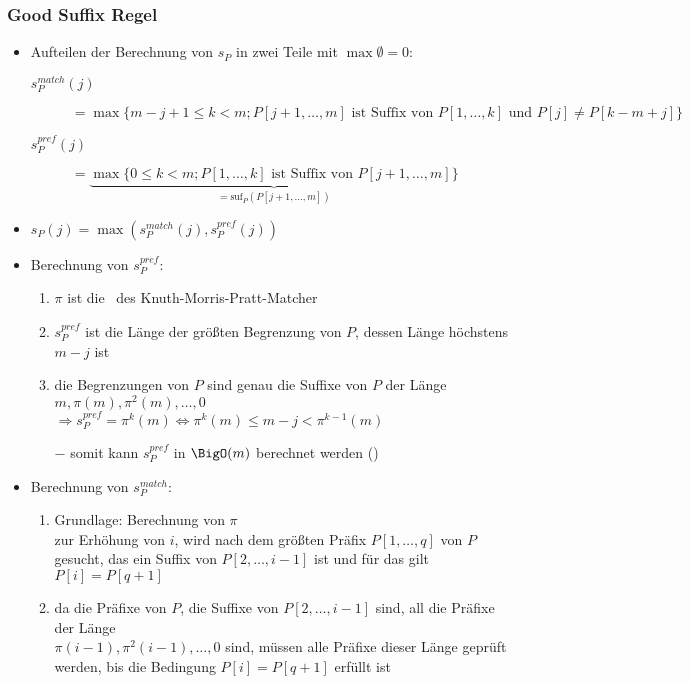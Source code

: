 \subsubsection*{Good Suffix Regel}
\begin{itemize}[itemsep=-2pt]
	\item Aufteilen der Berechnung von $s_P$ in zwei Teile mit $\max\emptyset=0$:
		\begin{description}
			\item[$s_P^{match}(j)$] $= \max\{m-j+1\leq k<m;P[j+1,\dots,m]\text{ ist Suffix von }P[1,\dots,k]\text{ und }P[j]\neq P[k-m+j]\}$
			\item[$s_P^{pref}(j)$] $=\underbrace{\max\{0\leq k<m;P[1,\dots,k]\text{ ist Suffix von } P[j+1,\dots,m]\}}_{=\text{suf}_P(P[j+1,\dots,m])}$
		\end{description}
	\item $s_P(j)=\max(s_P^{match}(j),s_P^{pref}(j))$
	\item Berechnung von $s_P^{pref}$:
		\begin{enumerate}
			\item $\pi$ ist die \bound~des Knuth-Morris-Pratt-Matcher
			\item $s_P^{pref}$ ist die Länge der größten Begrenzung von $P$, dessen Länge höchstens $m-j$ ist
			\item die Begrenzungen von $P$ sind genau die Suffixe von $P$ der Länge $m,\pi(m),\pi^2(m),\dots,0$\\
			$\Rightarrow s_P^{pref}=\pi^k(m) \Longleftrightarrow\pi^k(m)\leq m-j<\pi^{k-1}(m)$\\\up
			
		\vspace*{-0.5\baselineskip}\item[$-$] somit kann $s_P^{pref}$ in $\BigO(m)$ berechnet werden ()
		\end{enumerate}
	\item Berechnung von $s_P^{match}$:
		\begin{enumerate}
			\item Grundlage: Berechnung von $\pi$\\
				zur Erhöhung von $i$, wird nach dem größten Präfix $P[1,\dots,q]$ von $P$ gesucht, das ein Suffix von $P[2,\dots,i-1]$ ist und für das gilt $P[i]=P[q+1]$
			\item da die Präfixe von $P$, die Suffixe von $P[2,\dots,i-1]$ sind, all die Präfixe der Länge\\
				$\pi(i-1),\pi^2(i-1),\dots,0$ sind, müssen alle Präfixe dieser Länge geprüft werden, bis die Bedingung $P[i]=P[q+1]$ erfüllt ist\\\up

\end{enumerate}
\end{itemize}
